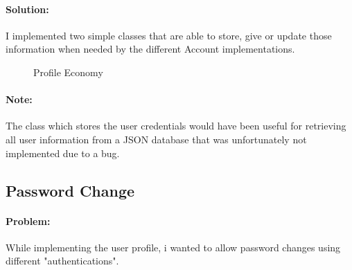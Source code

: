 \documentclass[a4paper,12pt]{report}
\begin{document}
        \paragraph{Solution:}I implemented two simple classes that are able to store, give or update those information when needed by the different Account implementations.
            \begin{figure}[H]
                \centering{}
                \caption{Profile Economy}
                \label{img:my_label}
            \end{figure}
        \paragraph{Note:}The class which stores the user credentials would have been useful for retrieving all user information from a JSON database that was unfortunately not implemented due to a bug.
        
    \subsection{Password Change}
        \paragraph{Problem:}While implementing the user profile, i wanted to allow password changes using different "authentications".
\end{document}
